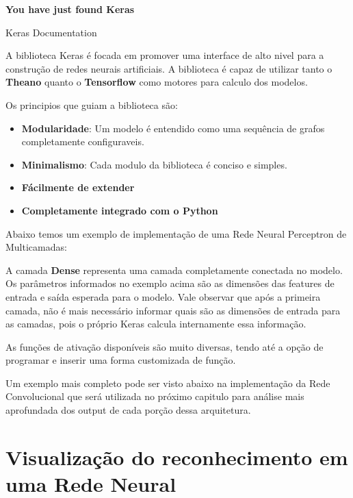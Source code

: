 \documentclass[
	12pt,				%
	oneside,			%
	a4paper,			%
	english,			%
	french,				%
	spanish,			%
	brazil,				%
	]{abntex2}
\begin{document}
\epigraph{\textbf{You have just found Keras}}{Keras Documentation}

\par A biblioteca Keras é focada em promover uma interface de alto nivel para a construção de redes neurais artificiais. A biblioteca é capaz de utilizar tanto o \textbf{Theano} quanto o \textbf{Tensorflow} como motores para calculo dos modelos.

Os principios que guiam a biblioteca são:

\begin{itemize}
  \item \textbf{Modularidade}: Um modelo é entendido como uma sequência de grafos completamente configuraveis.
  \item \textbf{Minimalismo}: Cada modulo da biblioteca é conciso e simples.
  \item \textbf{Fácilmente de extender}
  \item \textbf{Completamente integrado com o Python}
\end{itemize}


\par Abaixo temos um exemplo de implementação de uma Rede Neural Perceptron de Multicamadas:


\par A camada \textbf{Dense} representa uma camada completamente conectada no modelo. Os parâmetros informados no exemplo acima são as dimensões das features de entrada e saída esperada para o modelo. Vale observar que após a primeira camada, não é mais necessário informar quais são as dimensões de entrada para as camadas, pois o próprio Keras calcula internamente essa informação.

\par As funções de ativação disponíveis são muito diversas, tendo até a opção de programar e inserir uma forma customizada de função.

\par Um exemplo mais completo pode ser visto abaixo na implementação da Rede Convolucional que será utilizada no próximo capitulo para análise mais aprofundada dos output de cada porção dessa arquitetura.



\chapter{Visualização do reconhecimento em uma Rede Neural}
\end{document}
